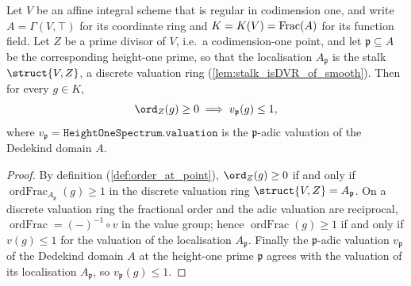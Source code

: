 \begin{lemma}
  \label{lem:chart_valuation_le_one_of_order_nonneg}
  Let \(V\) be an affine integral scheme that is regular in codimension one, and
  write \(A = \Gamma(V, \top)\) for its coordinate ring and \(K = K(V) =
  \operatorname{Frac}(A)\) for its function field. Let \(Z\) be a prime divisor of \(V\),
  i.e.\ a codimension-one point, and let \(\mathfrak p \subseteq A\) be the
  corresponding height-one prime, so that the localisation \(A_{\mathfrak p}\)
  is the stalk \(\struct{V, Z}\), a discrete valuation ring
  (\cref{lem:stalk_isDVR_of_smooth}). Then for every \(g \in K\),
  \[
    \ord_Z(g) \ge 0 \;\Longrightarrow\;
    v_{\mathfrak p}(g) \le 1,
  \]
  where \(v_{\mathfrak p} = \texttt{HeightOneSpectrum.valuation}\) is the
  \(\mathfrak p\)-adic valuation of the Dedekind domain \(A\).
\end{lemma}

\begin{proof}
  \leanok
  By definition (\cref{def:order_at_point}), \(\ord_Z(g) \ge 0\) if and only
  if \(\operatorname{ordFrac}_{A_{\mathfrak p}}(g) \ge 1\) in the discrete
  valuation ring \(\struct{V, Z} = A_{\mathfrak p}\). On a discrete valuation
  ring the fractional order and the adic valuation are reciprocal,
  \(\operatorname{ordFrac} = (-)^{-1} \circ v\) in the value group; hence
  \(\operatorname{ordFrac}(g) \ge 1\) if and only if \(v(g) \le 1\) for the
  valuation of the localisation \(A_{\mathfrak p}\). Finally the
  \(\mathfrak p\)-adic valuation \(v_{\mathfrak p}\) of the Dedekind domain
  \(A\) at the height-one prime \(\mathfrak p\) agrees with the valuation of its
  localisation \(A_{\mathfrak p}\), so \(v_{\mathfrak p}(g) \le 1\).
\end{proof}

